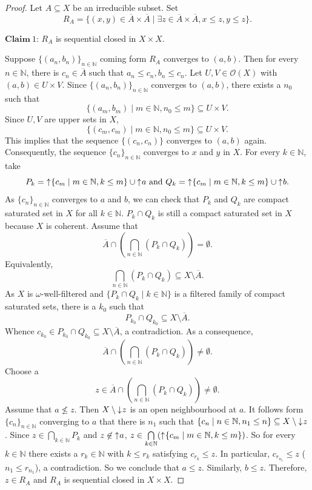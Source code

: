 \documentclass[preprint,12pt]{elsarticle}
\numberwithin{equation}{section}
\newcommand{\dn}{\mathord{\downarrow}\hspace{0.05em}}
\newcommand{\up}{\mathord{\uparrow}\hspace{0.05em}}
\begin{document}
\begin{proof} Let $A\subseteq X$ be an irreducible subset. Set
$$R_{A}=\{(x,y)\in \overline{A}\times\overline{A}\mid \exists z\in\overline{A}\times\overline{A}, x\leq z,y\leq z\}.$$

$\mathbf{Claim}\ 1$: $R_{A}$ is sequential closed in $X\times X$.

Suppose $\{(a_{n},b_{n})\}_{n\in\mathbb{N}}$ coming form $R_{A}$ converges to $(a,b)$. Then for every $n\in\mathbb{N}$, there is $c_{n}\in\overline{A}$ such that $a_{n}\leq c_{n},b_{n}\leq c_{n}$. Let $U,V\in\mathcal{O}(X)$ with $(a,b)\in U\times V$. Since $\{(a_{n},b_{n})\}_{n\in\mathbb{N}}$ converges to $(a,b)$, there exists a $n_{0}$ such that $$\{(a_{m},b_{m})\mid m\in\mathbb{N},n_{0}\leq m\}\subseteq U\times V.$$ Since $U,V$ are upper sets in $X$, $$\{(c_{m},c_{m})\mid m\in\mathbb{N},n_{0}\leq m\}\subseteq U\times V.$$ This implies that the sequence $\{(c_{n},c_{n})\}$ converges to $(a,b)$ again. Consequently, the sequence $\{c_{n}\}_{n\in\mathbb{N}}$ converges to $x$ and $y$ in $X$. For every $k\in\mathbb{N}$, take
$$P_{k}=\up\{c_{m}\mid m\in\mathbb{N},k\leq m\}\cup\up a\ \mbox{and}\ Q_{k}=\up\{c_{m}\mid m\in\mathbb{N},k\leq m\}\cup\up b.$$
As $\{c_{n}\}_{n\in\mathbb{N}}$ converges to $a$ and $b$, we can check that $P_{k}$ and $Q_{k}$ are compact saturated set in $X$ for all $k\in\mathbb{N}$. $P_{k}\cap Q_{k}$ is still a compact saturated set in $X$ because $X$ is coherent. Assume that $$\overline{A}\cap(\bigcap\limits_{n\in\mathbb{N}}(P_{k}\cap Q_{k}))=\emptyset.$$ Equivalently, $$\bigcap\limits_{n\in\mathbb{N}}(P_{k}\cap Q_{k})\subseteq X\setminus \overline{A}.$$ As $X$ is $\omega$-well-filtered and $\{P_{k}\cap Q_{k}\mid k\in\mathbb{N}\}$ is a filtered family of compact saturated sets, there is a $k_{0}$ such that $$P_{k_{0}}\cap Q_{k_{0}}\subseteq X\setminus \overline{A}.$$ Whence $c_{k_{0}}\in P_{k_{0}}\cap Q_{k_{0}}\subseteq X\setminus \overline{A}$, a contradiction. As a consequence, $$\overline{A}\cap(\bigcap\limits_{n\in\mathbb{N}}(P_{k}\cap Q_{k}))\neq\emptyset.$$ Choose a $$z\in\overline{A}\cap(\bigcap\limits_{n\in\mathbb{N}}(P_{k}\cap Q_{k}))\neq\emptyset.$$ Assume that $a\not\leq z$. Then $X\setminus \dn z$ is an open neighbourhood at $a$. It follows form $\{c_{n}\}_{n\in\mathbb{N}}$ converging to $a$ that there is $n_{1}$ such that $\{c_{n}\mid n\in\mathbb{N},n_{1}\leq n\}\subseteq X\setminus \dn z$. Since $z\in\bigcap\limits_{k\in\mathbb{N}}P_{k}$ and $z\not\in\up a$, $z\in\bigcap\limits_{k\in\mathbb{N}}(\up\{c_{m}\mid m\in\mathbb{N},k\leq m\})$. So for every $k\in\mathbb{N}$ there exists a $r_{k}\in\mathbb{N}$ with $k\leq r_{k}$ satisfying $c_{r_{k}}\leq z$. In particular, $c_{r_{n_{1}}}\leq z$ ($n_{1}\leq r_{n_{1}}$), a contradiction. So we conclude that $a\leq z$. Similarly, $b\leq z$. Therefore, $z\in R_{A}$ and $R_{A}$ is sequential closed in $X\times X$.


\end{proof}
\end{document}
